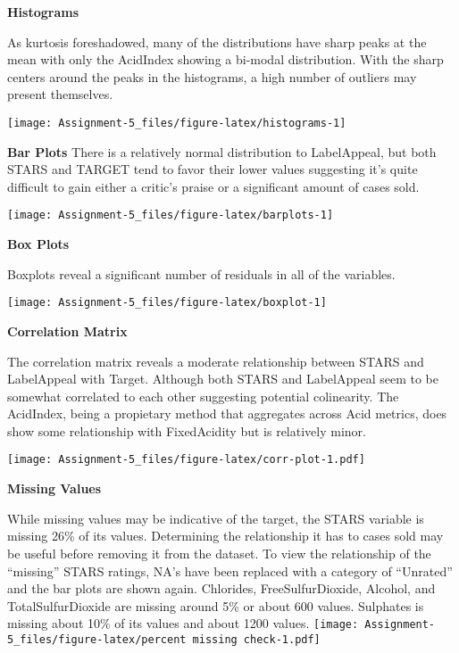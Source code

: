 \documentclass[
]{article}
\begin{document}
\newpage

\textbf{Histograms}

As kurtosis foreshadowed, many of the distributions have sharp peaks at
the mean with only the AcidIndex showing a bi-modal distribution. With
the sharp centers around the peaks in the histograms, a high number of
outliers may present themselves.

\begin{center}\texttt{[image: Assignment-5\_files/figure-latex/histograms-1]} \end{center}

\newpage

\textbf{Bar Plots} There is a relatively normal distribution to
LabelAppeal, but both STARS and TARGET tend to favor their lower values
suggesting it's quite difficult to gain either a critic's praise or a
significant amount of cases sold.

\begin{center}\texttt{[image: Assignment-5\_files/figure-latex/barplots-1]} \end{center}

\textbf{Box Plots}

Boxplots reveal a significant number of residuals in all of the
variables. \newline

\begin{center}\texttt{[image: Assignment-5\_files/figure-latex/boxplot-1]} \end{center}

\textbf{Correlation Matrix}

The correlation matrix reveals a moderate relationship between STARS and
LabelAppeal with Target. Although both STARS and LabelAppeal seem to be
somewhat correlated to each other suggesting potential colinearity. The
AcidIndex, being a propietary method that aggregates across Acid
metrics, does show some relationship with FixedAcidity but is relatively
minor.

\texttt{[image: Assignment-5\_files/figure-latex/corr-plot-1.pdf]}

\textbf{Missing Values}

While missing values may be indicative of the target, the STARS variable
is missing 26\% of its values. Determining the relationship it has to
cases sold may be useful before removing it from the dataset. To view
the relationship of the ``missing'' STARS ratings, NA's have been
replaced with a category of ``Unrated'' and the bar plots are shown
again. Chlorides, FreeSulfurDioxide, Alcohol, and TotalSulfurDioxide are
missing around 5\% or about 600 values. Sulphates is missing about 10\%
of its values and about 1200 values.
\texttt{[image: Assignment-5\_files/figure-latex/percent missing check-1.pdf]}
\end{document}
